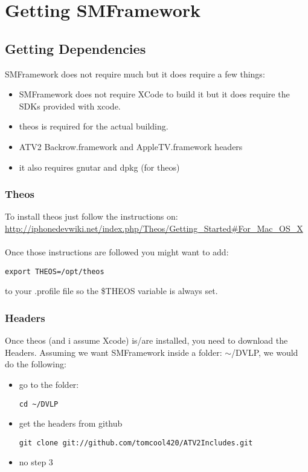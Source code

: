 \documentclass[11pt]{article}
\begin{document}
\paragraph{}
\section{Getting SMFramework}
\subsection{Getting Dependencies}
SMFramework does not require much but it does require a few things:
\begin{itemize}
\item SMFramework does not require XCode to build it but it does require the SDKs provided with xcode.
\item theos is required for the actual building. 
\item ATV2 Backrow.framework and AppleTV.framework headers
\item it also requires gnutar and dpkg (for theos)
\end{itemize}
\subsubsection{Theos}
To install theos just follow the instructions on:\\
\url{http://iphonedevwiki.net/index.php/Theos/Getting_Started#For_Mac_OS_X}
\paragraph{}
Once those instructions are followed you might want to add: 
\begin{lstlisting}
export THEOS=/opt/theos
\end{lstlisting}
to your .profile file so the \$THEOS variable is always set.
\subsubsection{Headers}
Once theos (and i assume Xcode) is/are installed, you need to download the Headers. Assuming we want SMFramework inside a folder: $\sim$/DVLP, we would do the following:
\begin{itemize}
\item go to the folder:
\begin{lstlisting}
cd ~/DVLP
\end{lstlisting}
\item get the headers from github 
\begin{lstlisting}
git clone git://github.com/tomcool420/ATV2Includes.git
\end{lstlisting}
\item no step 3
\end{itemize}
\end{document}
